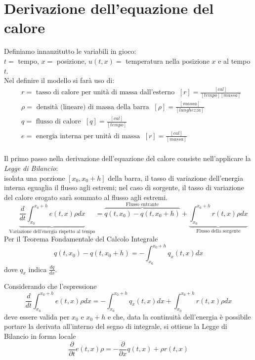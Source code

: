 \section{Derivazione dell'equazione del calore}
Definiamo innanzitutto le variabili in gioco:\\
$t=$ tempo, $x=$ posizione, $u(t,x)=$ temperatura nella posizione $x$ e al tempo $t$.\\
Nel definire il modello si far\`a uso di:
%
\begin{align*}
& r= \mbox{ tasso di calore per unit\`a di massa dall'esterno } \; [r]=\frac{[cal]}{[tempo][massa]}\\
& \rho= \mbox{ densit\`a (lineare) di massa della barra } \; [\rho]=\frac{[massa]}{[lunghezza]}\\
& q= \mbox{ flusso di calore } \; [q]=\frac{[cal]}{[tempo]}\\
& e= \mbox{ energia interna per unit\`a di massa } \; [r]=\frac{[cal]}{[massa]}\\
\end{align*}

Il primo passo nella derivazione dell'equazione del calore consiste nell'applicare la \textit{Legge di Bilancio}:\\
isolata una porzione $[x_0, x_0+h]$ della barra, il tasso di variazione dell'energia interna eguaglia il flusso agli estremi;
nel caso di sorgente, il tasso di variazione del calore erogato sar\`a sommato al flusso agli estremi.
\[
	\underbrace{\frac{d}{dt}\int_{x_0}^{x_0+h} e(t,x)\rho
dx}_\text{Variazione dell'energia rispetto al tempo}
	= \overbrace{q(t,x_0)-q(t,x_0 +h)}^\text{Flusso entrante}
	+\underbrace{\int_{x_0}^{x_0+h} r(t,x) \rho dx}_\text{Flusso della
sorgente}
\]
Per il Teorema Fondamentale del Calcolo Integrale
\[
	q(t,x_0)-q(t,x_0 +h) = -\int_{x_0}^{x_0+h} q_x(t,x)dx
\]
dove $q_x$ indica $\frac{dq}{dx}$.

Considerando che l'espressione
\[
	\frac{d}{dt}\int_{x_0}^{x_0+h} e(t,x)\rho dx
	= -\int_{x_0}^{x_0+h} q_x(t,x)dx
	+\int_{x_0}^{x_0+h} r(t,x) \rho dx
\]
deve essere valida per $x_0$ e $x_0+h$ e che, data la continuit\`a dell'energia
\`e possibile portare
la derivata all'interno del segno di integrale, si ottiene la Legge di Bilancio
in forma locale
\[
	\frac{\partial}{\partial t} e(t,x)\rho= -\frac{\partial}{\partial
x}q(t,x)+\rho r(t,x)
\]

